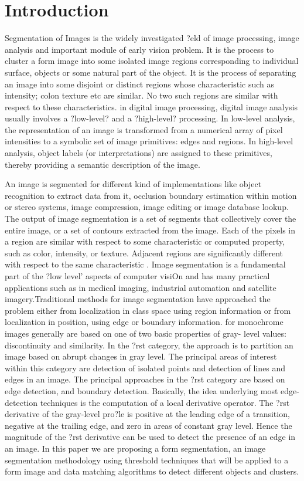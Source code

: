 \chapter{Introduction}
\label{intro}
Segmentation of Images is the widely investigated ?eld of image processing, image analysis and important module of early vision problem. It is the process to cluster a form image into some isolated image regions corresponding to individual surface, objects or some natural part of the object. It is the process of separating an image into some disjoint or distinct regions whose characteristic such as intensity; colon texture etc are similar. No two such regions are similar with respect to these characteristics. in digital image processing, digital image analysis usually involves a ?low-level? and a ?high-level? processing. In low-level analysis, the representation of an image is transformed from a numerical array of pixel intensities to a symbolic set of image primitives: edges and regions. In high-level analysis, object labels (or interpretations) are assigned to these primitives, thereby providing a semantic description of the image.

An image is segmented for different kind of implementations like object recognition to extract data from it, occlusion boundary estimation within motion or stereo systems, image compression, image editing or image database lookup.
The output of image segmentation is a set of segments that collectively cover the entire image, or a set of contours extracted from the image. Each of the pixels in a region are similar with respect to some characteristic or computed property, such as color, intensity, or texture. Adjacent regions are significantly different with respect to the same characteristic
. 
Image segmentation is a fundamental part of the ?low level' aspects of computer visiOn and has many practical applications such as in medical imaging, industrial automation and satellite imagery.Traditional methods for image segmentation have approached the problem either from localization in class space using region information or from localization in position, using edge or boundary information. for monochrome images generally are based on one of two basic properties of gray- level values: discontinuity and similarity. In the ?rst category, the approach is to partition an image based on abrupt changes in gray level. The principal areas of interest within this category are detection of isolated points and detection of lines and edges in an image. The principal approaches in the ?rst category are based on edge detection, and boundary detection. Basically, the idea underlying most edge-detection techniques is the computation of a local derivative operator. The ?rst derivative of the gray-level pro?le is positive at the leading edge of a transition, negative at the trailing edge, and zero in areas of constant gray level. Hence the magnitude of the ?rst derivative can be used to detect the presence of an edge in an image.
In this paper we are proposing a form segmentation, an image segmentation methodology using threshold techniques that will be applied to a form image and data matching algorithms to detect different objects and clusters.

